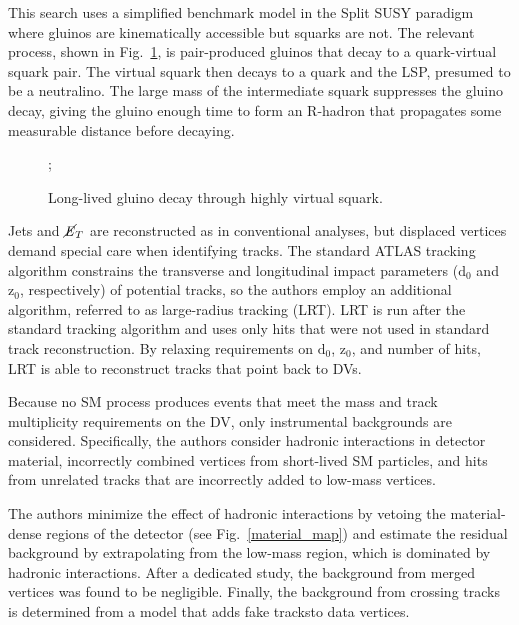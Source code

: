 \documentclass[12pt]{article}
\begin{document}
        This search uses a simplified benchmark model in the Split SUSY paradigm where gluinos are kinematically accessible but squarks are not. The relevant process, shown in Fig.~\ref{displaced_process}, is pair-produced gluinos that decay to a quark-virtual squark pair. The virtual squark then decays to a quark and the LSP, presumed to be a neutralino. The large mass of the intermediate squark suppresses the gluino decay, giving the gluino enough time to form an R-hadron that propagates some measurable distance before decaying. 

        \noindent \begin{figure}[htbp] \begin{center}
        ;
        \caption{Long-lived gluino decay through highly virtual squark.}
        \label{displaced_process}
        \end{center} \end{figure}

        Jets and $\cancel{\it{E}}_{T}$ are reconstructed as in conventional analyses, but displaced vertices demand special care when identifying tracks. The standard ATLAS tracking algorithm constrains the transverse and longitudinal impact parameters ($\mathrm{d}_0$ and $\mathrm{z}_0$, respectively) of potential tracks, so the authors employ an additional algorithm, referred to as large-radius tracking (LRT). LRT is run after the standard tracking algorithm and uses only hits that were not used in standard track reconstruction. By relaxing requirements on $\mathrm{d}_0$, $\mathrm{z}_0$, and number of hits, LRT is able to reconstruct tracks that point back to DVs.
        
        Because no SM process produces events that meet the mass and track multiplicity requirements on the DV, only instrumental backgrounds are considered. Specifically, the authors consider hadronic interactions in detector material, incorrectly combined vertices from short-lived SM particles, and hits from unrelated tracks that are incorrectly added to low-mass vertices.

        The authors minimize the effect of hadronic interactions by vetoing the material-dense regions of the detector (see Fig.~\ref{material_map}) and estimate the residual background by extrapolating from the low-mass region, which is dominated by hadronic interactions. After a dedicated study, the background from merged vertices was found to be negligible. Finally, the background from crossing tracks is determined from a model that adds fake tracksto data vertices.
\end{document}
